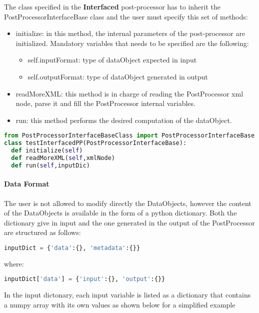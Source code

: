 The class specified in the \textbf{Interfaced} post-processor has to inherit the
PostProcessorInterfaceBase class and the user must specify this set of
methods:
\begin{itemize}
  \item initialize: in this method, the internal parameters of the
  post-processor are initialized. Mandatory variables that needs to be
  specified are the following:
\begin{itemize}
  \item self.inputFormat: type of dataObject expected in input
  \item self.outputFormat: type of dataObject generated in output
\end{itemize}
  \item readMoreXML: this method is in charge of reading the PostProcessor xml
  node, parse it and fill the PostProcessor internal variables.
  \item run: this method performs the desired computation of the dataObject.
\end{itemize}

\begin{lstlisting}[language=python]
from PostProcessorInterfaceBaseClass import PostProcessorInterfaceBase
class testInterfacedPP(PostProcessorInterfaceBase):
  def initialize(self)
  def readMoreXML(self,xmlNode)
  def run(self,inputDic)
\end{lstlisting}

\paragraph{Data Format}
The user is not allowed to modify directly the DataObjects, however the
content of the DataObjects is available in the form of a python dictionary.
Both the dictionary give in input and the one generated in the output of the
PostProcessor are structured as follows:

\begin{lstlisting}[language=python]
inputDict = {'data':{}, 'metadata':{}}
\end{lstlisting}

where:

\begin{lstlisting}[language=python]
inputDict['data'] = {'input':{}, 'output':{}}
\end{lstlisting}

In the input dictonary, each input variable is listed as a dictionary that
contains a numpy array with its own values as shown below for a simplified
example

